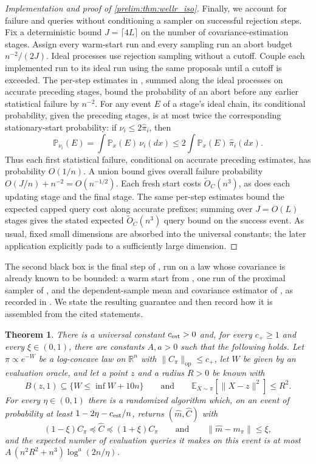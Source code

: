 \documentclass[11pt]{article}
\numberwithin{equation}{section}
\newtheorem{theorem}{Theorem}
\theoremstyle{definition}
\newcommand{\R}{\mathbb{R}}
\newcommand{\E}[2]{\mathbb{E}_{#1}\left[#2\right]}
\newcommand{\op}{\mathrm{op}}
\begin{document}
\begin{proof}[Implementation and proof of \cref{prelim:thm:wellr_iso}]
Finally, we account for failure and queries without conditioning a sampler
on successful rejection steps.
Fix a deterministic bound $J=\lceil4L\rceil$ on the number of
covariance-estimation stages.
Assign every warm-start run and every sampling run an abort budget
$n^{-2}/(2J)$.
Ideal processes use rejection sampling without a cutoff.
Couple each implemented run to its ideal run using the same proposals until
a cutoff is exceeded.
The per-step estimates in \cite[Lemmas~2.14 and~3.10]{KV25}, summed along
the ideal processes on accurate preceding stages, bound the probability of
an abort before any earlier statistical failure by $n^{-2}$.
For any event $E$ of a stage's ideal chain, its conditional probability,
given the preceding stages, is at most twice the corresponding
stationary-start probability: if $\nu_i\leq2\widehat\pi_i$, then
\[
 \mathbb P_{\nu_i}(E)
 =\int\mathbb P_x(E)\,\nu_i(dx)
 \leq2\int\mathbb P_x(E)\,\widehat\pi_i(dx).
\]
Thus each first statistical failure, conditional on accurate preceding
estimates, has probability $O(1/n)$.
A union bound gives overall failure probability
$O(J/n)+n^{-2}=O(n^{-1/2})$.
Each fresh start costs $\widetilde O_C(n^3)$, as does each updating stage
and the final stage.
The same per-step estimates bound the expected capped query cost along
accurate prefixes; summing over $J=O(L)$ stages gives the stated expected
$\widetilde O_C(n^3)$ query bound on the success event.
As usual, fixed small dimensions are absorbed into the universal constants;
the later application explicitly pads to a sufficiently large dimension.
\end{proof}

The second black box is the final step of \cite[Algorithm~4]{KV25}, run on a
law whose covariance is already known to be bounded: a warm start from
\cite[Theorem~3.16]{KV25}, one run of the proximal sampler of
\cite[Section~2]{KV25}, and the dependent-sample mean and covariance estimator
of \cite[Corollaries~10 and~33]{KZ24:arxiv}, as recorded in
\cite[Lemma~4.6]{KV25}.
We state the resulting guarantee and then record how it is assembled from the
cited statements.

\begin{theorem}
\label{thm:moment-estimation}
There is a universal constant $c_{\rm est}>0$ and, for every
$c_+\geq1$ and every
$\xi\in(0,1)$, there are constants
$A,a>0$ such that the following holds.
Let $\pi\propto e^{-W}$ be a log-concave law on
$\R^n$ with
$\|C_\pi\|_{\op}\leq c_+$, let
$W$ be given by an evaluation oracle, and let a point
$z$ and a radius
$R>0$ be known with
\[
 B(z,1)\subseteq\{W\leq\inf W+10n\}
 \qquad\text{and}\qquad
 \E{X\sim\pi}{\|X-z\|^2}\leq R^2 .
\]
For every $\eta\in(0,1)$ there is a randomized algorithm which, on an event of
probability at least
$1-2\eta-c_{\rm est}/n$, returns
$(\widehat m,\widehat C)$ with
\[
 (1-\xi)C_\pi\preceq\widehat C\preceq(1+\xi)C_\pi
 \qquad\text{and}\qquad
 \|\widehat m-m_\pi\|\leq\xi,
\]
and the expected number of evaluation queries it makes on this event is at
most
$A\,(n^2R^2+n^3)\log^{a}(2n/\eta)$.
\end{theorem}
\end{document}
